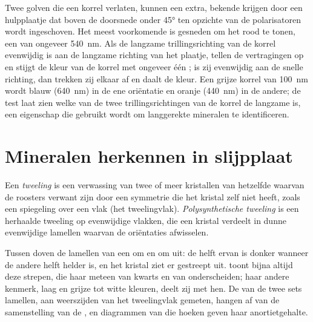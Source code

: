 Twee golven die een korrel verlaten, kunnen een extra, bekende  krijgen door een hulpplaatje dat boven de doorsnede onder \ang{45} ten opzichte van de
polarisatoren wordt ingeschoven. Het meest voorkomende is gesneden om het  rood te tonen, een  van ongeveer \qty{540}{nm}. Als de langzame
trillingsrichting van de korrel evenwijdig is aan de langzame richting van het plaatje, tellen de vertragingen op en stijgt de kleur van de korrel met ongeveer
één ; is zij evenwijdig aan de snelle richting, dan trekken zij elkaar af en daalt de kleur. Een  grijze korrel van \qty{100}{nm} wordt 
blauw (\qty{640}{nm}) in de ene oriëntatie en  oranje (\qty{440}{nm}) in de andere; de test laat zien welke van de twee trillingsrichtingen van de korrel
de langzame is, een eigenschap die gebruikt wordt om langgerekte mineralen te identificeren.

\section{Mineralen herkennen in slijpplaat}

\begin{definition}\label{def:b1:optical-mineralogy:twin}
Een \emph{tweeling} is een verwassing van twee of meer kristallen van hetzelfde  waarvan de roosters verwant zijn door een symmetrie
die het kristal zelf niet heeft, zoals een spiegeling over een vlak (het tweelingvlak). \emph{Polysynthetische tweeling} is een herhaalde
tweeling op evenwijdige vlakken, die een kristal verdeelt in dunne evenwijdige lamellen waarvan de oriëntaties afwisselen.
\end{definition}

Tussen  doven de lamellen van een  om en om uit: de helft ervan is donker wanneer de andere helft helder is, en het
kristal ziet er gestreept uit.  toont bijna altijd deze strepen, die haar meteen van kwarts en van  onderscheiden; haar andere kenmerk, laag
 en  grijze tot witte kleuren, deelt zij met hen. De  van de twee sets lamellen, aan weerszijden van het tweelingvlak gemeten, hangen
af van de samenstelling van de , en diagrammen van die hoeken geven haar anortietgehalte.


